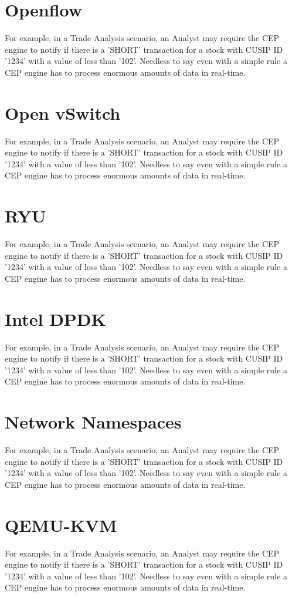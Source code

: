 \section{Openflow}
For example, in a Trade Analysis scenario, an Analyst may require the CEP engine to notify if there is a 'SHORT' transaction for a stock with CUSIP ID '1234' with a value of less than '102'. Needless to say even with a simple rule a CEP engine has to process enormous amounts of data in real-time.
\section{Open vSwitch}
For example, in a Trade Analysis scenario, an Analyst may require the CEP engine to notify if there is a 'SHORT' transaction for a stock with CUSIP ID '1234' with a value of less than '102'. Needless to say even with a simple rule a CEP engine has to process enormous amounts of data in real-time.
\section{RYU}
For example, in a Trade Analysis scenario, an Analyst may require the CEP engine to notify if there is a 'SHORT' transaction for a stock with CUSIP ID '1234' with a value of less than '102'. Needless to say even with a simple rule a CEP engine has to process enormous amounts of data in real-time.
\section{Intel DPDK}
For example, in a Trade Analysis scenario, an Analyst may require the CEP engine to notify if there is a 'SHORT' transaction for a stock with CUSIP ID '1234' with a value of less than '102'. Needless to say even with a simple rule a CEP engine has to process enormous amounts of data in real-time.
\section{Network Namespaces}
For example, in a Trade Analysis scenario, an Analyst may require the CEP engine to notify if there is a 'SHORT' transaction for a stock with CUSIP ID '1234' with a value of less than '102'. Needless to say even with a simple rule a CEP engine has to process enormous amounts of data in real-time.
\section{QEMU-KVM}
For example, in a Trade Analysis scenario, an Analyst may require the CEP engine to notify if there is a 'SHORT' transaction for a stock with CUSIP ID '1234' with a value of less than '102'. Needless to say even with a simple rule a CEP engine has to process enormous amounts of data in real-time.
